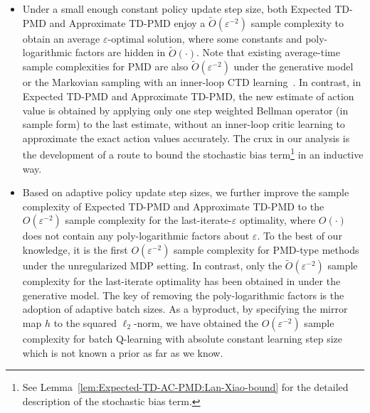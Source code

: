 \documentclass[10pt]{article}
\theoremstyle{plain}
\theoremstyle{definition}
\begin{document}
\begin{itemize}
    \item Under a small enough constant policy update step size, both Expected TD-PMD and Approximate TD-PMD enjoy a $\tilde O(\varepsilon^{-2})$ sample complexity to obtain  an average $\varepsilon$-optimal solution, where some constants and poly-logarithmic factors are hidden in $\tilde{O}(\cdot)$. Note that existing average-time sample complexities for PMD are also $\tilde O(\varepsilon^{-2})$ under the generative model or the Markovian sampling with {an inner-loop CTD learning}~\citep{Lan_2021,li2024stochastic}. In contrast, in Expected TD-PMD and Approximate TD-PMD, the new estimate of action value is obtained by applying only one step weighted Bellman operator (in sample form) to the last estimate, without {an inner-loop critic learning to approximate the exact action values accurately.} {The crux in our analysis is the development of a route to bound the stochastic bias term\footnote{See Lemma~\ref{lem:Expected-TD-AC-PMD:Lan-Xiao-bound} for the detailed description of the stochastic bias term.} in an inductive way.}
    \item Based on adaptive policy update step sizes, we further improve the sample complexity of Expected TD-PMD and Approximate TD-PMD to the $O(\varepsilon^{-2})$  sample complexity for the last-iterate-$\varepsilon$ optimality, where $O(\cdot)$ does not contain any poly-logarithmic factors about $\varepsilon$. To the best of our knowledge, it is the first  $O(\varepsilon^{-2})$ sample complexity for PMD-type methods under the unregularized MDP setting. In contrast, only the $\tilde{O}(\varepsilon^{-2})$
    sample complexity for the last-iterate optimality has  been obtained in \citet{Lan_2021,Xiao_2022, Johnson_Pike-Burke_Rebeschini_2023, protopapas2024policy,liu2025tdpmd} under the generative model. {The key of removing the poly-logarithmic factors is the adoption of  adaptive batch sizes.} As a byproduct, by specifying the mirror map $h$ to the squared $\ell_2$-norm, we have obtained the $O(\varepsilon^{-2})$ sample complexity for batch Q-learning  with absolute constant learning step size which is not known a prior as far as we know. 
\end{itemize}
\end{document}
